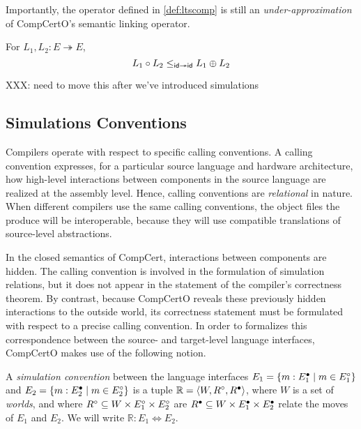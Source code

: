 \documentclass[sigplan,10pt,authordraft]{acmart}
\begin{document}
Importantly,
the operator defined in \autoref{def:ltscomp}
is still an \emph{under-approximation}
of CompCertO's semantic linking operator.

\begin{theorem}
For $L_1, L_2 : E \twoheadrightarrow E$,
\[
  L_1 \circ L_2
  \le_{ \mathsf{id}  \twoheadrightarrow  \mathsf{id} }
  L_1 \oplus L_2
\]
\end{theorem}

XXX: need to move this after we've introduced simulations


\subsection{Simulations Conventions} %

Compilers operate with respect to specific calling conventions.
A calling convention expresses,
for a particular source language and hardware architecture,
how high-level interactions between components in the source language
are realized at the assembly level.
Hence, calling conventions are \emph{relational} in nature.
When different compilers use the same calling conventions,
the object files the produce will be interoperable,
because they will use compatible translations
of source-level abstractions.

In the closed semantics of CompCert,
interactions between components are hidden.
The calling convention is involved in the formulation
of simulation relations,
but it does not appear in the statement
of the compiler's correctness theorem.
By contrast,
because CompCertO reveals these previously hidden interactions
to the outside world,
its correctness statement
must be formulated with respect to a precise calling convention.
In order to formalizes this correspondence between
the source- and target-level language interfaces,
CompCertO makes use of the following notion.

\begin{definition}
A \emph{simulation convention} between
the language interfaces
$E_1 = \{ m : E_1^\bullet \mid m \in E_1^\circ \}$ and
$E_2 = \{ m : E_2^\bullet \mid m \in E_2^\circ \}$
is a tuple $\mathbb{R} = \langle W, R^\circ, R^\bullet \rangle$,
where $W$ is a set of \emph{worlds},
and where
$R^\circ \subseteq W \times E_1^\circ \times E_2^\circ$ are
$R^\bullet \subseteq W \times E_1^\bullet \times E_2^\bullet$
relate the moves of $E_1$ and $E_2$.
We will write $\mathbb{R} : E_1 \Leftrightarrow E_2$.
\end{definition}
\end{document}
